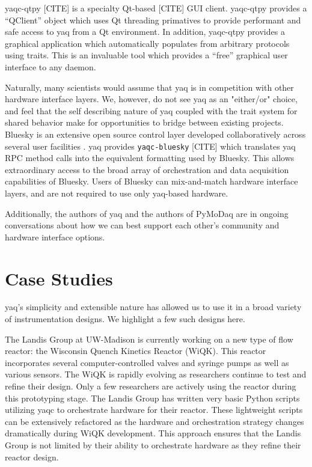 \documentclass[aip, amsmath, amssymb, reprint,]{revtex4-1}
\begin{document}
yaqc-qtpy [CITE] is a specialty Qt-based [CITE] GUI client.
yaqc-qtpy provides a ``QClient'' object which uses Qt threading primatives to provide performant and safe access to yaq from a Qt environment.
In addition, yaqc-qtpy provides a graphical application which automatically populates from arbitrary protocols using traits.
This is an invaluable tool which provides a ``free'' graphical user interface to any daemon.

Naturally, many scientists would assume that yaq is in competition with other hardware interface layers.
We, however, do not see yaq as an "either/or" choice, and feel that the self describing nature of yaq coupled with the trait system for shared behavior make for opportunities to bridge between existing projects.
Bluesky is an extensive open source control layer developed collaboratively across several user facilities \cite{AllanDanielB2019a}.
yaq provides \texttt{yaqc-bluesky} [CITE] which translates yaq RPC method calls into the equivalent formatting used by Bluesky.
This allows extraordinary access to the broad array of orchestration and data acquisition capabilities of Bluesky.
Users of Bluesky can mix-and-match hardware interface layers, and are not required to use only yaq-based hardware.

Additionally, the authors of yaq and the authors of PyMoDaq \cite{WeberSebastien2021a} are in ongoing conversations about how we can best support each other's community and hardware interface options.

\section{Case Studies}

yaq's simplicity and extensible nature has allowed us to use it in a broad variety of instrumentation designs.
We highlight a few such designs here.

The Landis Group at UW-Madison is currently working on a new type of flow reactor: the Wisconsin Quench Kinetics Reactor (WiQK).
This reactor incorporates several computer-controlled valves and syringe pumps as well as various sensors.
The WiQK is rapidly evolving as researchers continue to test and refine their design.
Only a few researchers are actively using the reactor during this prototyping stage.
The Landis Group has written very basic Python scripts utilizing yaqc to orchestrate hardware for their reactor.
These lightweight scripts can be extensively refactored as the hardware and orchestration strategy changes dramatically during WiQK development.
This approach ensures that the Landis Group is not limited by their ability to orchestrate hardware as they refine their reactor design.
\end{document}
